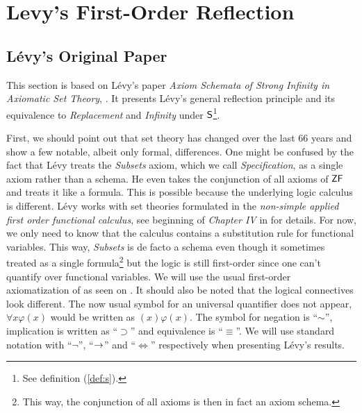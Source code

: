 \section{Levy's First-Order Reflection}\label{sec:first_order}

\subsection{Lévy's Original Paper}\label{sec:levy1960}
This section is based on Lévy's paper \emph{Axiom Schemata of Strong Infinity in Axiomatic Set Theory}, \cite{Levy60a}. It presents Lévy's general reflection principle and its equivalence to \emph{Replacement} and \emph{Infinity} under $\sf{S}$\footnote{See definition (\ref{def:s}).}.

First, we should point out that set theory has changed over the last 66 years and show a few notable, albeit only formal, differences.
One might be confused by the fact that Lévy treats the \emph{Subsets} axiom, which we call \emph{Specification}, as a single axiom rather than a schema. He even takes the conjunction of all axioms of $\sf{ZF}$ and treats it like a formula. This is possible because the underlying logic calculus is different. Lévy works with set theories formulated in the \emph{non-simple applied first order functional calculus}, see beginning of \emph{Chapter IV} in \cite{church1996introduction} for details. For now, we only need to know that the calculus contains a substitution rule for functional variables. This way, \emph{Subsets} is de facto a schema even though it sometimes treated as a single formula\footnote{This way, the conjunction of all axioms is then in fact an axiom schema.} but the logic is still first-order since one can't quantify over functional variables. We will use the usual first-order axiomatization of  as seen on \cite{JechBook}.
It should also be noted that the logical connectives look different. The now usual symbol for an universal quantifier does not appear, $\forall x \varphi (x)$ would be written as $(x) \varphi (x)$. The symbol for negation is ``$\sim$'', implication is written as ``$\supset$'' and equivalence is ``$\equiv$''. We will use standard notation with ``$\neg$'', ``$\rightarrow$'' and ``$\iff$'' respectively when presenting Lévy's results.

